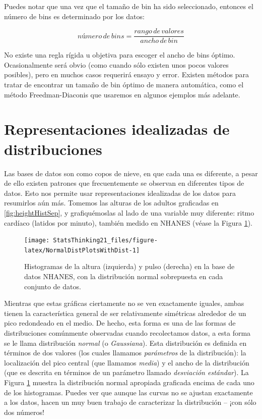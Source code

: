 \documentclass[
  12pt,
]{book}
\begin{document}
Puedes notar que una vez que el tamaño de bin ha sido seleccionado, entonces el número de bins es determinado por los datos:

\[
número\, de\, bins  = \frac{rango\, de\, valores}{ancho\, de\, bin}
\]

No existe una regla rígida u objetiva para escoger el ancho de bins óptimo. Ocasionalmente será obvio (como cuando sólo existen unos pocos valores posibles), pero en muchos casos requerirá ensayo y error. Existen métodos para tratar de encontrar un tamaño de bin óptimo de manera automática, como el método Freedman-Diaconis que usaremos en algunos ejemplos más adelante.

\hypertarget{representaciones-idealizadas-de-distribuciones}{%
\section{Representaciones idealizadas de distribuciones}\label{representaciones-idealizadas-de-distribuciones}}

Las bases de datos son como copos de nieve, en que cada una es diferente, a pesar de ello existen patrones que frecuentemente se observan en diferentes tipos de datos. Esto nos permite usar representaciones idealizadas de los datos para resumirlos aún más. Tomemos las alturas de los adultos graficadas en \ref{fig:heightHistSep}, y grafiquémoslas al lado de una variable muy diferente: ritmo cardíaco (latidos por minuto), también medido en NHANES (véase la Figura \ref{fig:NormalDistPlotsWithDist}).

\begin{figure}
\texttt{[image: StatsThinking21\_files/figure-latex/NormalDistPlotsWithDist-1]} \caption{Histogramas de la altura (izquierda) y pulso (derecha) en la base de datos NHANES, con la distribución normal sobrepuesta en cada conjunto de datos.}\label{fig:NormalDistPlotsWithDist}
\end{figure}

Mientras que estas gráficas ciertamente no se ven exactamente iguales, ambas tienen la característica general de ser relativamente simétricas alrededor de un pico redondeado en el medio. De hecho, esta forma es una de las formas de distribuciones comúnmente observadas cuando recolectamos datos, a esta forma se le llama distribución \emph{normal} (o \emph{Gaussiana}). Esta distribución es definida en términos de dos valores (los cuales llamamos \emph{parámetros} de la distribución): la localización del pico central (que llamamos \emph{media}) y el ancho de la distribución (que es descrita en términos de un parámetro llamado \emph{desviación estándar}). La Figura \ref{fig:NormalDistPlotsWithDist} muestra la distribución normal apropiada graficada encima de cada uno de los histogramas. Puedes ver que aunque las curvas no se ajustan exactamente a los datos, hacen un muy buen trabajo de caracterizar la distribución -- ¡con sólo dos números!
\end{document}
